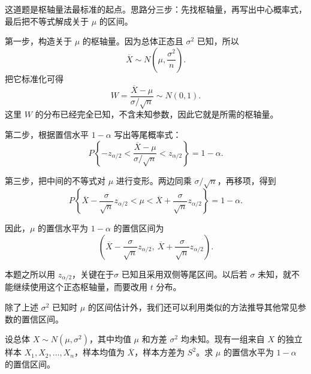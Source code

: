 ﻿\documentclass[lang=cn,11pt]{elegantbook}
\begin{document}
\begin{solution}
这道题是枢轴量法最标准的起点。思路分三步：先找枢轴量，再写出中心概率式，最后把不等式解成关于 \(\mu\) 的区间。

第一步，构造关于 \(\mu\) 的枢轴量。因为总体正态且 \(\sigma^2\) 已知，所以
\[
\overline{X}\sim N\!\left(\mu,\frac{\sigma^2}{n}\right).
\]
把它标准化可得
\[
W=\frac{\overline{X}-\mu}{\sigma/\sqrt{n}}\sim N(0,1).
\]
这里 \(W\) 的分布已经完全已知，不含未知参数，因此它就是所需的枢轴量。

第二步，根据置信水平 \(1-\alpha\) 写出等尾概率式：
\[
P\left\{-z_{\alpha/2}<\frac{\overline{X}-\mu}{\sigma/\sqrt{n}}<z_{\alpha/2}\right\}=1-\alpha.
\]

第三步，把中间的不等式对 \(\mu\) 进行变形。两边同乘 \(\sigma/\sqrt{n}\)，再移项，得到
\[
P\left\{\overline{X}-\frac{\sigma}{\sqrt{n}}z_{\alpha/2}<\mu<\overline{X}+\frac{\sigma}{\sqrt{n}}z_{\alpha/2}\right\}=1-\alpha.
\]

因此，\(\mu\) 的置信水平为 \(1-\alpha\) 的置信区间为
\[
\left(\overline{X}-\frac{\sigma}{\sqrt{n}}z_{\alpha/2},\ \overline{X}+\frac{\sigma}{\sqrt{n}}z_{\alpha/2}\right).
\]

\begin{note}
本题之所以用 \(z_{\alpha/2}\)，关键在于\(\sigma\) 已知且采用双侧等尾区间。以后若 \(\sigma\) 未知，就不能继续使用这个正态枢轴量，而要改用 \(t\) 分布。
\end{note}
\end{solution}

除了上述 $\sigma^2$ 已知时 $\mu$ 的区间估计外，我们还可以利用类似的方法推导其他常见参数的置信区间。

\begin{exercise} \label{ex:ci_mu_unknown_var}
设总体 $X\sim N(\mu,\sigma^2)$，其中均值 $\mu$ 和方差 $\sigma^2$ 均未知。现有一组来自 $X$ 的独立样本 $X_1,X_2,\dots,X_n$，样本均值为 $\overline{X}$，样本方差为 $S^2$。求 $\mu$ 的置信水平为 $1-\alpha$ 的置信区间。
\end{exercise}
\end{document}
